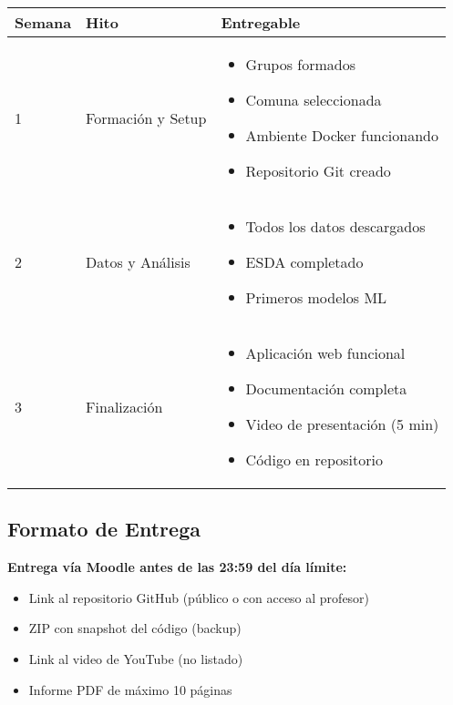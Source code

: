 \documentclass[12pt,a4paper]{article}
\begin{document}
\begin{table}[H]
\centering
\begin{tabular}{llp{6cm}}
\toprule
\textbf{Semana} & \textbf{Hito} & \textbf{Entregable} \\
\midrule
1 & Formación y Setup &
\begin{itemize}
    \item Grupos formados
    \item Comuna seleccionada
    \item Ambiente Docker funcionando
    \item Repositorio Git creado
\end{itemize} \\
\midrule
2 & Datos y Análisis &
\begin{itemize}
    \item Todos los datos descargados
    \item ESDA completado
    \item Primeros modelos ML
\end{itemize} \\
\midrule
3 & Finalización &
\begin{itemize}[
    \item Aplicación web funcional
    \item Documentación completa
    \item Video de presentación (5 min)
    \item Código en repositorio
\end{itemize} \\
\bottomrule
\end{tabular}
\end{table}

\subsection{Formato de Entrega}

\begin{alertbox}
\textbf{Entrega vía Moodle antes de las 23:59 del día límite:}
\begin{itemize}
    \item Link al repositorio GitHub (público o con acceso al profesor)
    \item ZIP con snapshot del código (backup)
    \item Link al video de YouTube (no listado)
    \item Informe PDF de máximo 10 páginas
\end{itemize}
\end{alertbox}
\end{document}
